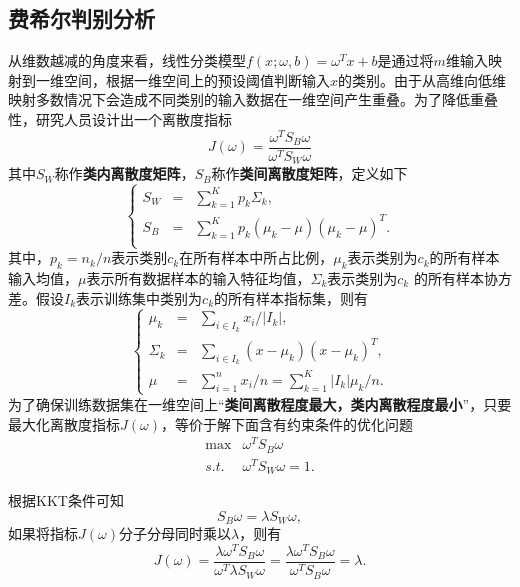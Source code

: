 \subsection{费希尔判别分析}%
从维数越减的角度来看，线性分类模型$f(x;\omega, b)=\omega^T x + b$是通过将$m$维输入映射到一维空间，根据一维空间上的预设阈值判断输入$x$的类别。由于从高维向低维映射多数情况下会造成不同类别的输入数据在一维空间产生重叠。为了降低重叠性，研究人员设计出一个离散度指标
\begin{equation}
    J(\omega) = \frac{\omega^T S_B \omega}{\omega^T S_W \omega}
\end{equation}
其中$S_W$称作\textbf{类内离散度矩阵}，$S_B$称作\textbf{类间离散度矩阵}，定义如下
\begin{equation}
\left\{
\begin{array}{lcl}
    S_W &=& \sum\limits_{k=1}^K p_k \Sigma_k,\\
    S_B &=& \sum\limits_{k=1}^K p_k (\mu_k-\mu)(\mu_k-\mu)^T.\\
\end{array}
\right.
\end{equation}
其中，$p_k=n_k/n$表示类别$c_k$在所有样本中所占比例，$\mu_k$表示类别为$c_k$的所有样本输入均值，$\mu$表示所有数据样本的输入特征均值，$\Sigma_k$表示类别为$c_k$ 的所有样本协方差。假设$I_k$表示训练集中类别为$c_k$的所有样本指标集，则有
\begin{equation}
\left\{
\begin{array}{lcl}
    \mu_k &=& \sum\limits_{i\in I_k} x_i/|I_k|,\\
    \Sigma_k &=& \sum\limits_{i\in I_k} (x-\mu_k)(x-\mu_k)^T,\\
    \mu &=& \sum\limits_{i=1}^n x_i/n = \sum\limits_{k=1}^K |I_k|\mu_k/n.
\end{array}
\right.
\end{equation}
为了确保训练数据集在一维空间上“\textbf{类间离散程度最大，类内离散程度最小}”，只要最大化离散度指标$J(\omega)$，等价于解下面含有约束条件的优化问题
\begin{equation}
\begin{array}{ll}
  \max & \omega^T S_B \omega\\
  \textit{s.t.} & \omega^T S_W \omega = 1.
\end{array}
\end{equation}

根据KKT条件可知
\begin{equation}\label{eq:lda-lambda}
    S_B \omega = \lambda S_W \omega,
\end{equation}
如果将指标$J(\omega)$分子分母同时乘以$\lambda$，则有
\begin{equation}
    J(\omega) = \frac{\lambda \omega^T S_B \omega}{\omega^T \lambda S_W \omega} = \frac{\lambda \omega^T S_B \omega}{\omega^T S_B \omega} = \lambda.
\end{equation}

